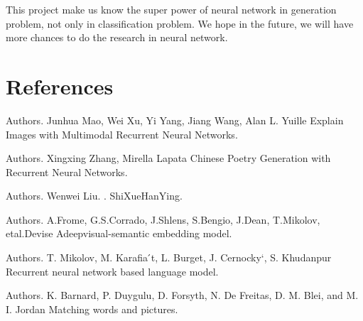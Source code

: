 \documentclass[10pt,twocolumn,letterpaper]{article}
\begin{document}
    This project make us know the super power of neural network in generation problem, not only in classification problem. We hope in the future, we will have more chances to do the research in neural network.

\section{References}
\begin{thebibliography}{1}\itemsep=-1pt

Authors.
\newblock Junhua Mao, Wei Xu, Yi Yang, Jiang Wang, Alan L. Yuille 
\newblock Explain Images with Multimodal Recurrent Neural Networks.

Authors.
\newblock Xingxing Zhang, Mirella Lapata
\newblock Chinese Poetry Generation with Recurrent Neural Networks.

Authors.
\newblock Wenwei Liu. 
. ShiXueHanYing.

Authors.
\newblock A.Frome, G.S.Corrado, J.Shlens, S.Bengio, 
\newblock J.Dean, T.Mikolov, etal.Devise
\newblock Adeepvisual-semantic embedding model.


Authors.
\newblock T. Mikolov, M. Karafia ́t, L. Burget, 
\newblock J. Cernocky`, S. Khudanpur
\newblock Recurrent neural network based language model.

Authors.
\newblock K. Barnard, P. Duygulu, D. Forsyth, N. De Freitas, 
\newblock D. M. Blei, and M. I. Jordan
\newblock Matching words and pictures.


\end{thebibliography}
\end{document}
